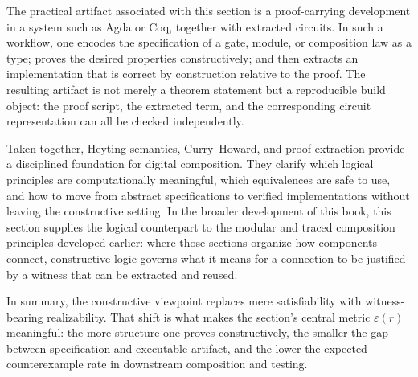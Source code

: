 \documentclass[11pt]{article}
\begin{document}
The practical artifact associated with this section is a proof-carrying development in a system such as Agda or Coq, together with extracted circuits. In such a workflow, one encodes the specification of a gate, module, or composition law as a type; proves the desired properties constructively; and then extracts an implementation that is correct by construction relative to the proof. The resulting artifact is not merely a theorem statement but a reproducible build object: the proof script, the extracted term, and the corresponding circuit representation can all be checked independently.

Taken together, Heyting semantics, Curry--Howard, and proof extraction provide a disciplined foundation for digital composition. They clarify which logical principles are computationally meaningful, which equivalences are safe to use, and how to move from abstract specifications to verified implementations without leaving the constructive setting. In the broader development of this book, this section supplies the logical counterpart to the modular and traced composition principles developed earlier: where those sections organize how components connect, constructive logic governs what it means for a connection to be justified by a witness that can be extracted and reused.

In summary, the constructive viewpoint replaces mere satisfiability with witness-bearing realizability. That shift is what makes the section's central metric \(\varepsilon(r)\) meaningful: the more structure one proves constructively, the smaller the gap between specification and executable artifact, and the lower the expected counterexample rate in downstream composition and testing.
\end{document}
